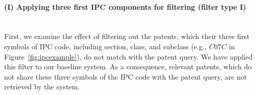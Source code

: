 \paragraph{(I) Applying three first IPC components for filtering (filter type I)}
\ \\
First, we examine the effect of filtering out the patents, which their three first symbols of IPC code, including section, class, and subclass (e.g., $\mathit{C07C}$ in Figure~\ref{fig:ipcexample}), do not match with the patent query. We have applied this filter to our baseline system. As a consequence, relevant patents, which do not share these three symbols of the IPC code with the patent query, are not retrieved by the system.   


